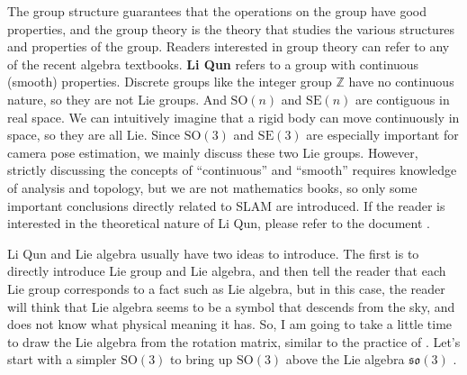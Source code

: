 The group structure guarantees that the operations on the group have good properties, and the group theory is the theory that studies the various structures and properties of the group. Readers interested in group theory can refer to any of the recent algebra textbooks. \textbf{Li Qun} refers to a group with continuous (smooth) properties. Discrete groups like the integer group $ \mathbb {Z} $ have no continuous nature, so they are not Lie groups. And $ \mathrm {SO}(n) $ and $ \mathrm {SE}(n) $ are contiguous in real space. We can intuitively imagine that a rigid body can move continuously in space, so they are all Lie. Since $ \mathrm {SO}( 3 ) $ and $ \mathrm {SE}( 3 ) $ are especially important for camera pose estimation, we mainly discuss these two Lie groups. However, strictly discussing the concepts of “continuous” and “smooth” requires knowledge of analysis and topology, but we are not mathematics books, so only some important conclusions directly related to SLAM are introduced. If the reader is interested in the theoretical nature of Li Qun, please refer to the document \cite {Varadarajan2013}.

Li Qun and Lie algebra usually have two ideas to introduce.
The first is to directly introduce Lie group and Lie algebra, and then tell the reader that each Lie group corresponds to a fact such as Lie algebra, but in this case, the reader will think that Lie algebra seems to be a symbol that descends from the sky, and does not know what physical meaning it has.
So, I am going to take a little time to draw the Lie algebra from the rotation matrix, similar to the practice of \cite{Ma2012}.
Let's start with a simpler $ \mathrm {SO}( 3 ) $ to bring up $ \mathrm {SO}( 3 ) $ above the Lie algebra $ \mathfrak {so}( 3 ) $ .
